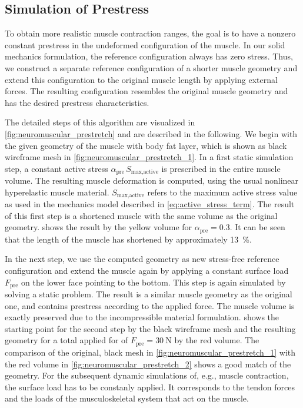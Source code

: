 \subsection{Simulation of Prestress}

To obtain more realistic muscle contraction ranges, the goal is to have a nonzero constant prestress in the undeformed configuration of the muscle. 
In our solid mechanics formulation, the reference configuration always has zero stress. Thus, we construct a separate reference configuration of a shorter muscle geometry and extend this configuration to the original muscle length by applying external forces. The resulting configuration resembles the original muscle geometry and has the desired prestress characteristics.

The detailed steps of this algorithm are visualized in \cref{fig:neuromuscular_prestretch} and are described in the following.
We begin with the given geometry of the muscle with body fat layer, which is shown as black wireframe mesh in \cref{fig:neuromuscular_prestretch_1}. In a first static simulation step, a constant active stress $\alpha_\text{pre}\,S_\text{max,active}$ is prescribed in the entire muscle volume. The resulting muscle deformation is computed, using the usual nonlinear hyperelastic muscle material. $S_\text{max,active}$ refers to the maximum active stress value as used in the mechanics model described in \cref{eq:active_stress_term}. The result of this first step is a shortened muscle with the same volume as the original geometry.  shows the result by the yellow volume for $\alpha_\text{pre}=0.3$. It can be seen that the length of the muscle has shortened by approximately \SI{13}{\percent}.

In the next step, we use the computed geometry as new stress-free reference configuration and extend the muscle again by applying a constant surface load $F_\text{pre}$ on the lower face pointing to the bottom. This step is again simulated by solving a static problem. The result is a similar muscle geometry as the original one, and contains prestress according to the applied force. The muscle volume is exactly preserved due to the incompressible material formulation.  shows the starting point for the second step by the black wireframe mesh and the resulting geometry for a total applied for of $F_\text{pre}=\SI{30}{\newton}$ by the red volume. The comparison of the original, black mesh in \cref{fig:neuromuscular_prestretch_1} with the red volume in \cref{fig:neuromuscular_prestretch_2} shows a good match of the geometry.
For the subsequent dynamic simulations of, e.g., muscle contraction, the surface load has to be constanly applied. It corresponds to the tendon forces and the loads of the musculoskeletal system that act on the muscle.

